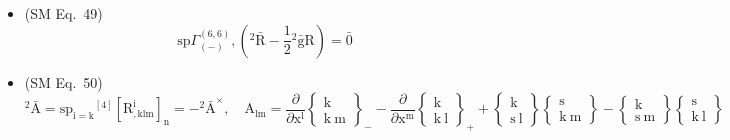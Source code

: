 \documentclass[
    12pt,              %
    a4paper,           %
    headings=normal,   %
    twoside=true,      %
    BCOR=8mm,          %
]{scrbook}
\begin{document}
\begin{itemize}[label={},leftmargin=0pt]
    \item (SM Eq.\ 49) 
    \[
    \mathrm{sp} \Gamma^{(6,6)}_{(-)}, \left( {}^2\bar{\mathrm{R}} - \frac{1}{2}{}^2\bar{\mathrm{g}}\mathrm{R} \right) = \bar{0}
    \]

    \item (SM Eq.\ 50) 
    \[
    {}^2\bar{\mathrm{A}} = \mathrm{sp}_{\mathrm{i=k}} {}^{[4]}\left[ \mathrm{R}^\mathrm{i}_{\mathrm{,klm}} \right]_\mathrm{n} = -{}^2\bar{\mathrm{A}}^\times, \quad \mathrm{A}_{\mathrm{lm}} = \frac{\partial}{\partial \mathrm{x^l}}\left\{ \begin{smallmatrix} \mathrm{k} \\ \mathrm{k\ m} \end{smallmatrix} \right\}_- - \frac{\partial}{\partial \mathrm{x^m}}\left\{ \begin{smallmatrix} \mathrm{k} \\ \mathrm{k\ l} \end{smallmatrix} \right\}_+ + \left\{ \begin{smallmatrix} \mathrm{k} \\ \mathrm{s\ l} \end{smallmatrix} \right\}\left\{ \begin{smallmatrix} \mathrm{s} \\ \mathrm{k\ m} \end{smallmatrix} \right\} - \left\{ \begin{smallmatrix} \mathrm{k} \\ \mathrm{s\ m} \end{smallmatrix} \right\}\left\{ \begin{smallmatrix} \mathrm{s} \\ \mathrm{k\ l} \end{smallmatrix} \right\}
    \]


\end{itemize}
\end{document}
